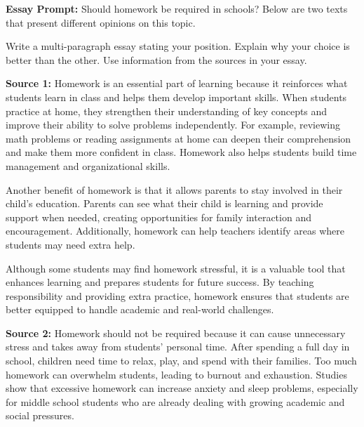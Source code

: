 \documentclass[12pt]{article}
\begin{document}
\begin{tcolorbox}[colframe=black!60, colback=white, 
coltitle=black, colbacktitle=black!15, fonttitle=\bfseries\Large, 
title=Independent Practice, halign title=center, left=10pt, right=10pt, top=10pt, bottom=15pt]
\textbf{Essay Prompt:}
Should homework be required in schools? Below are two texts that present different opinions on this topic.  

 

\vspace{1em}

Write a multi-paragraph essay stating your position. Explain why your choice is better than the other. Use information from the sources in your essay.

\vspace{1em}


\textbf{Source 1:} Homework is an essential part of learning because it reinforces what students learn in class and helps them develop important skills. When students practice at home, they strengthen their understanding of key concepts and improve their ability to solve problems independently. For example, reviewing math problems or reading assignments at home can deepen their comprehension and make them more confident in class. Homework also helps students build time management and organizational skills. 

Another benefit of homework is that it allows parents to stay involved in their child’s education. Parents can see what their child is learning and provide support when needed, creating opportunities for family interaction and encouragement. Additionally, homework can help teachers identify areas where students may need extra help. 

Although some students may find homework stressful, it is a valuable tool that enhances learning and prepares students for future success. By teaching responsibility and providing extra practice, homework ensures that students are better equipped to handle academic and real-world challenges.

 


\vspace{1em}

\textbf{Source 2:} Homework should not be required because it can cause unnecessary stress and takes away from students’ personal time. After spending a full day in school, children need time to relax, play, and spend with their families. Too much homework can overwhelm students, leading to burnout and exhaustion. Studies show that excessive homework can increase anxiety and sleep problems, especially for middle school students who are already dealing with growing academic and social pressures.


\end{tcolorbox}
\end{document}
